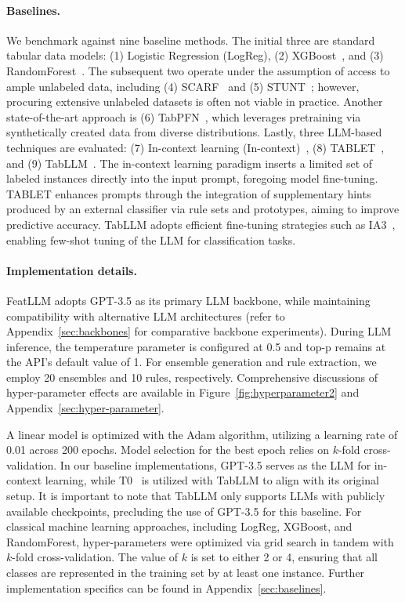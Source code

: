 \vspace*{-0.12in}
\paragraph{Baselines.}
We benchmark against nine baseline methods. The initial three are standard tabular data models: (1) Logistic Regression (LogReg), (2) XGBoost~\cite{chen2016xgboost}, and (3) RandomForest~\cite{ho1995random}. The subsequent two operate under the assumption of access to ample unlabeled data, including (4) SCARF~\cite{bahri2022scarf} and (5) STUNT~\cite{nam2023stunt}; however, procuring extensive unlabeled datasets is often not viable in practice. Another state-of-the-art approach is (6) TabPFN~\cite{hollmann2022tabpfn}, which leverages pretraining via synthetically created data from diverse distributions. Lastly, three LLM-based techniques are evaluated: (7) In-context learning (In-context)~\cite{wei2022emergent}, (8) TABLET~\cite{slack2023tablet}, and (9) TabLLM~\cite{hegselmann2023tabllm}. The in-context learning paradigm inserts a limited set of labeled instances directly into the input prompt, foregoing model fine-tuning. TABLET enhances prompts through the integration of supplementary hints produced by an external classifier via rule sets and prototypes, aiming to improve predictive accuracy. TabLLM adopts efficient fine-tuning strategies such as IA3~\cite{liu2022few}, enabling few-shot tuning of the LLM for classification tasks.

\vspace*{-0.12in}
\paragraph{Implementation details.}
\textsf{FeatLLM} adopts GPT-3.5 as its primary LLM backbone, while maintaining compatibility with alternative LLM architectures (refer to Appendix~\ref{sec:backbones} for comparative backbone experiments). During LLM inference, the temperature parameter is configured at 0.5 and top-p remains at the API's default value of 1. For ensemble generation and rule extraction, we employ 20 ensembles and 10 rules, respectively. Comprehensive discussions of hyper-parameter effects are available in Figure~\ref{fig:hyperparameter2} and Appendix~\ref{sec:hyper-parameter}.

A linear model is optimized with the Adam algorithm, utilizing a learning rate of 0.01 across 200 epochs. Model selection for the best epoch relies on $k$-fold cross-validation. In our baseline implementations, GPT-3.5 serves as the LLM for in-context learning, while T0~\cite{sanh2022multitask} is utilized with TabLLM to align with its original setup. It is important to note that TabLLM only supports LLMs with publicly available checkpoints, precluding the use of GPT-3.5 for this baseline. For classical machine learning approaches, including LogReg, XGBoost, and RandomForest, hyper-parameters were optimized via grid search in tandem with $k$-fold cross-validation. The value of $k$ is set to either 2 or 4, ensuring that all classes are represented in the training set by at least one instance. Further implementation specifics can be found in Appendix~\ref{sec:baselines}.

